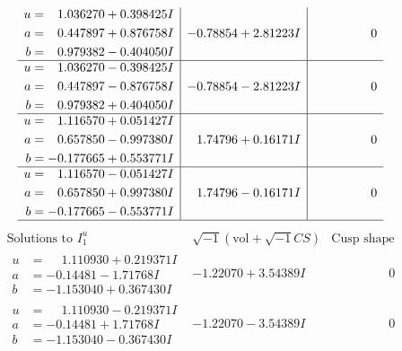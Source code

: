 \documentclass[1p]{elsarticle_modified}
\theoremstyle{definition}
\newcommand{\I}{\sqrt{-1}}
\begin{document}
$$\begin{array}{c|c|c}
\begin{aligned}
u &= \phantom{-}1.036270 + 0.398425 I \\
a &= \phantom{-}0.447897 + 0.876758 I \\
b &= \phantom{-}0.979382 - 0.404050 I\end{aligned}
 & -0.78854 + 2.81223 I & \phantom{-0.000000 } 0 \\ \hline\begin{aligned}
u &= \phantom{-}1.036270 - 0.398425 I \\
a &= \phantom{-}0.447897 - 0.876758 I \\
b &= \phantom{-}0.979382 + 0.404050 I\end{aligned}
 & -0.78854 - 2.81223 I & \phantom{-0.000000 } 0 \\ \hline\begin{aligned}
u &= \phantom{-}1.116570 + 0.051427 I \\
a &= \phantom{-}0.657850 - 0.997380 I \\
b &= -0.177665 + 0.553771 I\end{aligned}
 & \phantom{-}1.74796 + 0.16171 I & \phantom{-0.000000 } 0 \\ \hline\begin{aligned}
u &= \phantom{-}1.116570 - 0.051427 I \\
a &= \phantom{-}0.657850 + 0.997380 I \\
b &= -0.177665 - 0.553771 I\end{aligned}
 & \phantom{-}1.74796 - 0.16171 I & \phantom{-0.000000 } 0\\
 \hline 
 \end{array}$$\newpage$$\begin{array}{c|c|c}  
\text{Solutions to }I^u_{1}& \I (\text{vol} + \sqrt{-1}CS) & \text{Cusp shape}\\
 \hline 
\begin{aligned}
u &= \phantom{-}1.110930 + 0.219371 I \\
a &= -0.14481 - 1.71768 I \\
b &= -1.153040 + 0.367430 I\end{aligned}
 & -1.22070 + 3.54389 I & \phantom{-0.000000 } 0 \\ \hline\begin{aligned}
u &= \phantom{-}1.110930 - 0.219371 I \\
a &= -0.14481 + 1.71768 I \\
b &= -1.153040 - 0.367430 I\end{aligned}
 & -1.22070 - 3.54389 I & \phantom{-0.000000 } 0 \\ \hline\begin{aligned}

\end{aligned}
\end{array}$$
\end{document}
